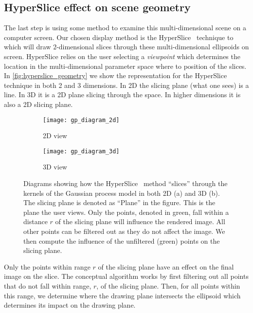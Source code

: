 \subsection{HyperSlice effect on scene geometry}
\label{sec:hypersliceeffectonscenegeometry}

The last step is using some method to examine this multi-dimensional
scene on a computer screen.  Our
chosen display method is the
HyperSlice~\cite{Wijk:1993} technique to which will draw $2$-dimensional
slices through these multi-dimensional ellipsoids on screen.  
HyperSlice relies on the user selecting a \textit{viewpoint} which 
determines the location in the multi-dimensional parameter space where to
position of the slices.
In \autoref{fig:hyperslice_geometry} we show the representation for the
HyperSlice technique in both 2 and 3 dimensions.  In 2D the slicing plane (what
one sees) is a line.  In 3D it is a 2D plane slicing through the space.  In 
higher dimensions it is also a 2D slicing plane.

\begin{figure}[htb]
  \centering
  \begin{subfigure}{0.25\textwidth}
    \centering
    \texttt{[image: gp\_diagram\_2d]}
    \caption{2D view}
    \label{fig:hs_2d}
  \end{subfigure}%
  \begin{subfigure}{0.25\textwidth}
    \centering
    \texttt{[image: gp\_diagram\_3d]}
    \caption{3D view}
    \label{fig:hs_3d}
  \end{subfigure}
  \caption{
    Diagrams showing how the HyperSlice~\cite{Wijk:1993} method ``slices'' 
    through the 
    kernels of the Gaussian process model in both 2D (a) and 3D (b).  The 
    slicing plane is denoted as ``Plane'' in the figure.  This is the 
    plane the user views.  Only the points, denoted in green, fall within a 
    distance $r$ of the slicing
    plane will influence the rendered image.  All other points can be filtered
    out as they do not affect the image.  We then compute the influence of 
    the unfiltered (green) points on the slicing plane.
  }
  \label{fig:hyperslice_geometry}
\end{figure}


Only the points within range $r$ of the slicing plane have an effect on the
final image on the slice.
The conceptual algorithm works by first filtering out all points
that do not fall within range, $r$, of the slicing plane.  Then, for all points
within this range, we determine where the drawing plane intersects the
ellipsoid which determines its impact on the drawing plane.

